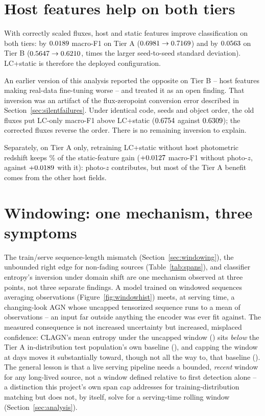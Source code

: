 \section{Host features help on both tiers}

With correctly scaled fluxes, host and static features improve
classification on both tiers: by $0.0189{}$ macro-F1 on Tier A
($0.6981{} \to 0.7169{}$) and by
$0.0563{}$ on Tier B ($0.5647{} \to 0.6210{}$,
\StaticGainOverSD{} times the larger seed-to-seed standard deviation).
LC+static is therefore the deployed configuration.

An earlier version of this analysis reported the opposite on Tier B -- host
features making real-data fine-tuning worse -- and treated it as an open
finding. That inversion was an artifact of the flux-zeropoint conversion
error described in Section~\ref{sec:silentfailures}. Under identical code,
seeds and object order, the old fluxes put LC-only
\OldFluxStaticInversion{} macro-F1 above LC+static
($0.6754{}$ against $0.6309{}$); the
corrected fluxes reverse the order. There is no remaining inversion to
explain.

Separately, on Tier A only, retraining LC+static without host photometric
redshift keeps \PhotozGainFractionSurviving{}\% of the static-feature gain
($+0.0127{}$ macro-F1 without photo-$z$, against
$+0.0189{}$ with it): photo-$z$ contributes, but most of the Tier A
benefit comes from the other host fields.

\section{Windowing: one mechanism, three symptoms}

The train/serve sequence-length mismatch (Section~\ref{sec:windowing}), the
unbounded right edge for non-fading sources (Table~\ref{tab:spans}), and
classifier entropy's inversion under domain shift are one mechanism
observed at three points, not three separate findings. A model trained on
windowed sequences averaging \WindowMeanSeqLenWindowed{} observations
(Figure~\ref{fig:windowhist}) meets, at serving time, a changing-look AGN
whose uncapped tensorized sequence runs to a mean of \ClagnSeqLenUncapped{}
observations -- an input far outside anything the encoder was ever fit
against. The measured consequence is not increased uncertainty but
increased, misplaced confidence: CLAGN's mean entropy under the uncapped
window (\ClagnEntropyUncapped{}) sits \emph{below} the Tier A in-distribution
test population's own baseline (\EntropyTierANormal{}), and capping the
window at \SpanChosenDefault{} days moves it substantially toward, though not all the way
to, that baseline (\ClagnEntropyCapped{}). The general lesson is that a live
serving pipeline needs a bounded, \emph{recent} window for any long-lived
source, not a window defined relative to first detection alone -- a
distinction this project's own span cap addresses for training-distribution
matching but does not, by itself, solve for a serving-time rolling window
(Section~\ref{sec:analysis}).

